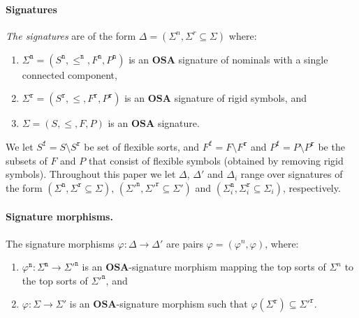 \documentclass{article}
\newcommand{\OSA}{{\mathbf{OSA}}}
\newcommand{\rigid}{\mathtt{r}}
\newcommand{\flexible}{\mathtt{f}}
\newcommand{\nom}{\mathtt{n}}
\begin{document}
\paragraph{Signatures} 
\emph{The signatures} are of the form $\Delta=(\Sigma^n,\Sigma^r\subseteq \Sigma)$ where:
\begin{enumerate}
\item $\Sigma^\nom=(S^\nom,\leq^\nom,F^\nom,P^\nom)$ is an $\OSA$ signature of nominals with a single connected component,

\item $\Sigma^\rigid=(S^\rigid,\leq, F^\rigid,P^\rigid)$ is an $\OSA$ signature of rigid symbols, and

\item $\Sigma=(S,\leq,F,P)$ is an $\OSA$ signature. 
\end{enumerate}
We let $S^\flexible = S\setminus S^\rigid$ be set of flexible sorts, and $F^\flexible=F\setminus F^\rigid$ and $P^\flexible=P\setminus P^\rigid$ be the subsets of $F$ and $P$ that consist of flexible symbols (obtained by removing rigid symbols).
Throughout this paper we let $\Delta$, $\Delta'$ and $\Delta_i$ range over signatures of the form $(\Sigma^\nom,\Sigma^\rigid\subseteq\Sigma)$, $(\Sigma'^\nom,\Sigma'^\rigid\subseteq \Sigma')$ and $(\Sigma^\nom_i,\Sigma^\rigid_i\subseteq \Sigma_i)$, respectively.

\paragraph{Signature morphisms.}
The signature morphisms $\varphi:\Delta\to \Delta'$ are pairs $\varphi=(\varphi^n,\varphi)$, where:
\begin{enumerate}[leftmargin=1.5em,nosep,label=\alph*)]
 \item $\varphi^\nom:\Sigma^\nom\to\Sigma'^\nom$ is an $\OSA$-signature morphism mapping the top sorts of $\Sigma^n$ to the top sorts of $\Sigma'^\nom$, and

 \item $\varphi:\Sigma\to\Sigma'$ is an $\OSA$-signature morphism such that $\varphi(\Sigma^\rigid)\subseteq \Sigma'^\rigid$.
\end{enumerate}
\end{document}
